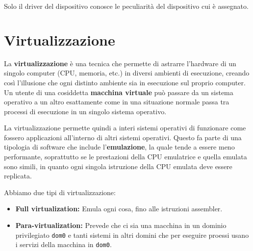         Solo il driver del dispositivo conosce le peculiarità del dispositivo cui è assegnato.
        
\section{Virtualizzazione}
    La \textbf{virtualizzazione} è una tecnica che permette di astrarre l'hardware di un singolo computer (CPU, memoria, etc.) in diversi ambienti di esecuzione, creando così l'illusione che ogni distinto ambiente sia in esecuzione sul proprio computer. Un utente di una cosiddetta \textbf{macchina virtuale} può passare da un sistema operativo a un altro esattamente come in una situazione normale passa tra processi di esecuzione in un singolo sistema operativo.
    
    La virtualizzazione permette quindi a interi sistemi operativi di funzionare come fossero applicazioni all'interno di altri sistemi operativi. Questo fa parte di una tipologia di software che include l'\textbf{emulazione}, la quale tende a essere meno performante, soprattutto se le prestazioni della CPU emulatrice e quella emulata sono simili, in quanto ogni singola istruzione della CPU emulata deve essere replicata.
    
    Abbiamo due tipi di virtualizzazione:
    \begin{itemize}
        \item \textbf{Full virtualization:} Emula ogni cosa, fino alle istruzioni assembler.
        \item \textbf{Para-virtualization:} Prevede che ci sia una macchina in un dominio privilegiato \texttt{dom0} e tanti sistemi in altri domini che per eseguire proessi usano i servizi della macchina in \texttt{dom0}.
    \end{itemize}
